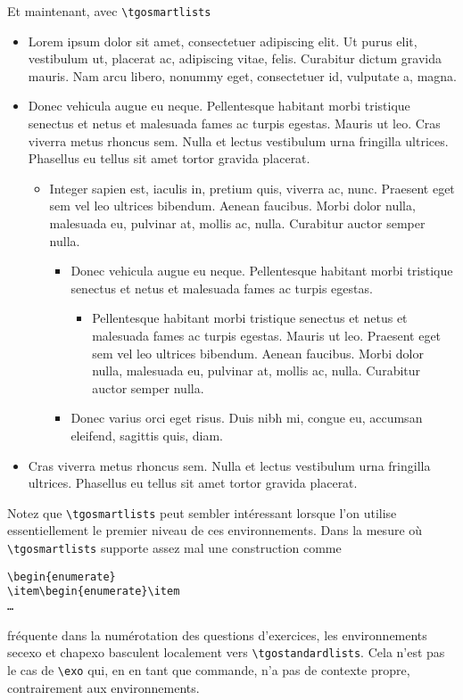\documentclass[french,ColorTheme=USAF,FontSize=10pt]{tango}
\newcommand\TO[1]{\textsf{#1}}
\begin{document}
\bigskip

Et maintenant, avec \verb+\tgosmartlists+ \tgosmartlists
\begin{itemize}
\item Lorem ipsum dolor sit amet, consectetuer adipiscing elit. Ut purus elit, vestibulum ut, placerat ac, adipiscing vitae, felis. Curabitur dictum gravida mauris. Nam arcu libero, nonummy eget, consectetuer id, vulputate a, magna.
\item Donec vehicula augue eu neque. Pellentesque habitant morbi tristique senectus et netus et malesuada fames ac turpis egestas. Mauris ut leo. Cras viverra metus rhoncus sem. Nulla et lectus vestibulum urna fringilla ultrices. Phasellus eu tellus sit amet tortor gravida placerat.
\begin{itemize}
\item Integer sapien est, iaculis in, pretium quis, viverra ac, nunc. Praesent eget sem vel leo ultrices bibendum. Aenean faucibus. Morbi dolor nulla, malesuada eu, pulvinar at, mollis ac, nulla. Curabitur auctor semper nulla.
\begin{itemize}
\item Donec vehicula augue eu neque. Pellentesque habitant morbi tristique senectus et netus et malesuada fames ac turpis egestas.
\begin{itemize}
\item Pellentesque habitant morbi tristique senectus et netus et malesuada fames ac turpis egestas. Mauris ut leo. Praesent eget sem vel leo ultrices bibendum. Aenean faucibus. Morbi dolor nulla, malesuada eu, pulvinar at, mollis ac, nulla. Curabitur auctor semper nulla.
\end{itemize}
\item Donec varius orci eget risus. Duis nibh mi, congue eu, accumsan eleifend, sagittis quis, diam. 
\end{itemize}\end{itemize}
\item  Cras viverra metus rhoncus sem. Nulla et lectus vestibulum urna fringilla ultrices. Phasellus eu tellus sit amet tortor gravida placerat.
\end{itemize}

Notez que \verb+\tgosmartlists+ peut sembler intéressant lorsque l'on utilise essentiellement le premier niveau de ces environnements.
Dans la mesure où  \verb+\tgosmartlists+ supporte assez mal une construction comme
\begin{tcolorbox}
\begin{verbatim}
\begin{enumerate}
\item\begin{enumerate}\item
…
\end{verbatim}
\end{tcolorbox}
fréquente dans la numérotation des questions d'exercices,
les environnements \TO{secexo} et \TO{chapexo} basculent localement vers \verb+\tgostandardlists+. Cela n'est pas le cas de \verb+\exo+ qui, en en tant que commande, n'a pas de contexte propre, contrairement aux environnements. \tgostandardlists
\end{document}
